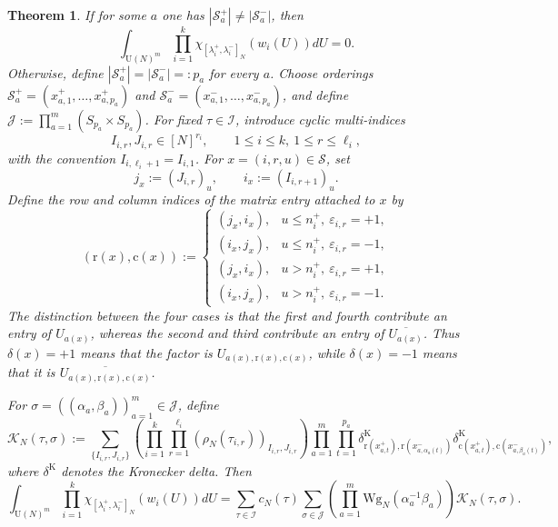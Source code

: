 \documentclass[11pt,a4paper,reqno]{article}
\newtheorem{theorem}{Theorem}[section]
\theoremstyle{definition}
\theoremstyle{remark}
\newcommand\U{{\mathrm U}}
\begin{document}
\begin{theorem}\label{prop:character_weingarten}
If for some $a$ one has $|\mathcal{S}_a^+|\neq |\mathcal{S}_a^-|$, then
\[
\int_{\U(N)^m}\prod_{i=1}^k \chi_{[\lambda_i^+,\lambda_i^-]_N}(w_i(U))dU = 0.
\]
Otherwise, define $|\mathcal{S}_a^+|=|\mathcal{S}_a^-|=:p_a$ for every $a$. Choose orderings $\mathcal{S}_a^+=(x_{a,1}^+,\dots,x_{a,p_a}^+)$ and $\mathcal{S}_a^-=(x_{a,1}^-,\dots,x_{a,p_a}^-)$, and define $\mathcal J:=\prod_{a=1}^m (S_{p_a}\times S_{p_a})$. For fixed $\tau\in\mathcal I$, introduce cyclic multi-indices
\[
I_{i,r},J_{i,r}\in [N]^{r_i},\qquad 1\le i\le k,\ 1\le r\le \ell_i,
\]
with the convention $I_{i,\ell_i+1}=I_{i,1}$. For $x=(i,r,u)\in\mathcal S$, set
\[
j_x := (J_{i,r})_u,\qquad i_x := (I_{i,r+1})_u.
\]
Define the row and column indices of the matrix entry attached to $x$ by
\[
(\mathrm r(x),\mathrm c(x)):=
\begin{cases}
(j_x,i_x),&u\le n_i^+,\ \varepsilon_{i,r}=+1,\\
(i_x,j_x),&u\le n_i^+,\ \varepsilon_{i,r}=-1,\\
(j_x,i_x),&u>n_i^+,\ \varepsilon_{i,r}=+1,\\
(i_x,j_x),&u>n_i^+,\ \varepsilon_{i,r}=-1.
\end{cases}
\]
The distinction between the four cases is that the first and fourth contribute an entry of $U_{a(x)}$, whereas the second and third contribute an entry of $\overline{U_{a(x)}}$. Thus $\delta(x)=+1$ means that the factor is $U_{a(x),\mathrm r(x),\mathrm c(x)}$, while $\delta(x)=-1$ means that it is $\overline{U_{a(x),\mathrm r(x),\mathrm c(x)}}$.

For $\sigma=((\alpha_a,\beta_a))_{a=1}^m\in\mathcal J$, define
\[
\mathcal K_N(\tau,\sigma):=\sum_{\{I_{i,r},J_{i,r}\}}\left(\prod_{i=1}^k\prod_{r=1}^{\ell_i}(\rho_N(\tau_{i,r}))_{I_{i,r},J_{i,r}}\right)
\prod_{a=1}^m\prod_{t=1}^{p_a}
\delta^{\mathrm K}_{\mathrm r(x_{a,t}^+),\mathrm r(x_{a,\alpha_a(t)}^-)}
\delta^{\mathrm K}_{\mathrm c(x_{a,t}^+),\mathrm c(x_{a,\beta_a(t)}^-)},
\]
where $\delta^{\mathrm K}$ denotes the Kronecker delta. Then
\begin{equation}\label{eq:refined-character-weingarten}
\int_{\U(N)^m}\prod_{i=1}^k \chi_{[\lambda_i^+,\lambda_i^-]_N}(w_i(U))dU
=\sum_{\tau\in\mathcal I}c_N(\tau)\sum_{\sigma\in\mathcal J}\left(\prod_{a=1}^m {\mathrm{Wg}}_N(\alpha_a^{-1}\beta_a)\right)\mathcal K_N(\tau,\sigma).
\end{equation}
\end{theorem}
\end{document}
